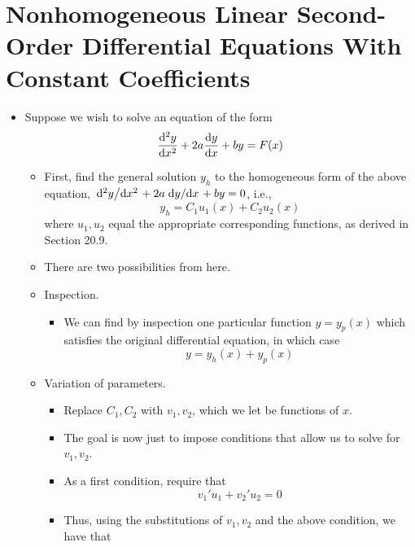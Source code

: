 \documentclass[../main.tex]{subfiles}
\begin{document}
\section{Nonhomogeneous Linear Second-Order Differential Equations With Constant Coefficients}
\begin{itemize}
    \item Suppose we wish to solve an equation of the form
    \begin{equation*}
        \dv[2]{y}{x}+2a\dv{y}{x}+by = F(x)
    \end{equation*}
    \begin{itemize}
        \item First, find the general solution $y_h$ to the homogeneous form of the above equation, $\dv*[2]{y}{x}+2a\dv*{y}{x}+by=0$, i.e.,
        \begin{equation*}
            y_h = C_1u_1(x)+C_2u_2(x)
        \end{equation*}
        where $u_1,u_2$ equal the appropriate corresponding functions, as derived in Section 20.9.
        \item There are two possibilities from here.
        \item Inspection.
        \begin{itemize}
            \item We can find by inspection one particular function $y=y_p(x)$ which satisfies the original differential equation, in which case
            \begin{equation*}
                y = y_h(x)+y_p(x)
            \end{equation*}
        \end{itemize}
        \item Variation of parameters.
        \begin{itemize}
            \item Replace $C_1,C_2$ with $v_1,v_2$, which we let be functions of $x$.
            \item The goal is now just to impose conditions that allow us to solve for $v_1,v_2$.
            \item As a first condition, require that
            \begin{equation*}
                v_1'u_1+v_2'u_2 = 0
            \end{equation*}
            \item Thus, using the substitutions of $v_1,v_2$ and the above condition, we have that
            \begin{align*}

\end{align*}
\end{itemize}
\end{itemize}
\end{itemize}
\end{document}
